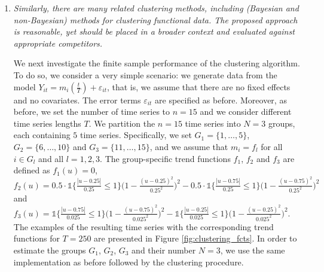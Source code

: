 \documentclass[a4paper,12pt]{article}
\newcommand{\ind}{\mathbb{1}}
\begin{document}
\begin{enumerate}[label=\arabic*.,leftmargin=0.6cm]
{\begin{itemize}[topsep=0pt]
  
\end{itemize}
}



\item \textit{Similarly, there are many related clustering methods, including (Bayesian and non-Bayesian) methods for clustering functional data. The proposed approach is reasonable, yet should be placed in a broader context and evaluated against appropriate competitors.}

{\color{blue} We next investigate the finite sample performance of the clustering algorithm.%
To do so, we consider a very simple scenario: we generate data from the model $Y_{it} = m_i(\frac{t}{T}) + \varepsilon_{it}$, that is, we assume that there are no fixed effects and no covariates. The error terms $\varepsilon_{it}$ are specified as before. Moreover, as before, we set the number of time series to $n = 15$ and we consider different time series lengths $T$. We partition the $n = 15$ time series into $N=3$ groups, each containing $5$ time series. Specifically, we set $G_1 = \{1,\ldots, 5\}$, $G_2 = \{6,\ldots, 10\}$ and $G_3 =  \{11,\ldots, 15\}$, and we assume that $m_i = f_l$ for all $i \in G_l$ and all $l = 1, 2, 3$. The group-specific trend functions $f_1$, $f_2$ and $f_3$ are defined as $f_1(u) = 0$, $f_2(u) = 0.5 \cdot \ind\Big\{\frac{|u - 0.25|}{0.25}\leq 1\Big\} \big(1 - \frac{(u - 0.25)^2}{0.25^2}\big)^2 - 0.5 \cdot \ind\Big\{\frac{|u - 0.75|}{0.25}\leq 1\Big\} \big(1 - \frac{(u - 0.75)^2}{0.25^2}\big)^2$ and $f_3(u) =  \ind\Big\{\frac{|u - 0.75|}{0.025}\leq 1\Big\} \big(1 - \frac{(u - 0.75)^2}{0.025^2}\big)^2 -  \ind\Big\{\frac{|u - 0.25|}{0.025}\leq 1\Big\} \big(1 - \frac{(u - 0.25)^2}{0.025^2}\big)^2$. The examples of the resulting time series with the corresponding trend functions for $T=250$ are presented in Figure \ref{fig:clustering_fcts}. In order to estimate the groups $G_1$, $G_2$, $G_3$ and their number $N = 3$, we use the same implementation as before followed by the clustering procedure.%
}


\end{enumerate}
\end{document}

